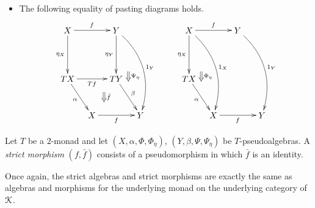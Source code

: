 \begin{Defi}
\begin{itemize}
\[    \]
    \item The following equality of pasting diagrams holds.
            \[
                        \xy
            (0,0)*+{X}="00";
            (20,0)*+{Y}="10";
            (0,-20)*+{TX}="01";
            (20,-20)*+{TY}="11";
            (10,-35)*+{X}="02";
            (30,-35)*+{Y}="12";
            {\ar^{f} "00" ; "10"};
            {\ar@/^1.5pc/^{1_Y} "10" ; "12"};
            {\ar_{\eta_X} "00" ; "01"};
            {\ar_{\eta_Y} "10" ; "11"};
            {\ar_{Tf} "01" ; "11"};
            {\ar_{\alpha} "01" ; "02"};
            {\ar_{f} "02" ; "12"};
            {\ar^{\beta} "11" ; "12"};
            {\ar@{=>}^{\bar{f}} (15,-25.5) ; (15,-29.5)};
            {\ar@{=>}^{\Psi_{\eta}} (25,-17) ; (25,-21)};
            (50,0)*+{X}="30";
            (70,0)*+{Y}="40";
            (50,-20)*+{TX}="31";
            (60,-35)*+{X}="32";
            (80,-35)*+{Y}="42";
            {\ar^{f} "30" ; "40"};
            {\ar_{\eta_X} "30" ; "31"};
            {\ar_{\alpha} "31" ; "32"};
            {\ar_{f} "32" ; "42"};
            {\ar@/^1.5pc/^{1_X} "30" ; "32"};
            {\ar@/^1.5pc/^{1_Y} "40" ; "42"};
            {\ar@{=>}^{\Phi_{\eta}} (55,-17) ; (55,-21)};
        \endxy
        \]
\end{itemize}
\end{Defi}

\begin{Defi}
Let $T$ be a $2$-monad and let $(X,\alpha,\Phi,\Phi_\eta)$, $(Y,\beta,\Psi,\Psi_\eta)$ be $T$-pseudoalgebras. A \textit{strict morphism} $(f, \bar{f})$ consists of a pseudomorphism in which $\bar{f}$ is an identity.
\end{Defi}

\begin{rem}
Once again, the strict algebras and strict morphisms are exactly the same as algebras and morphisms for the underlying monad on the underlying category of $\mathcal{K}$.
\end{rem}

